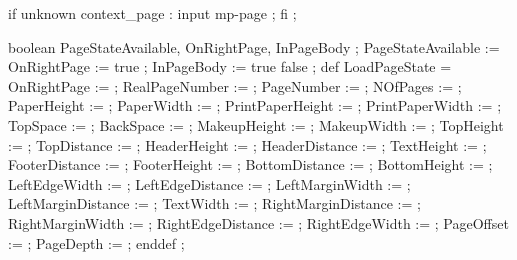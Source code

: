 


\unprotect

\appendtoks
  if unknown context_page : input mp-page ; fi ;
\to \MPinitializations


  boolean PageStateAvailable, OnRightPage, InPageBody ; 
  PageStateAvailable := OnRightPage := true ;
  InPageBody         := \ifinpagebody true \else false \fi ; 
  def LoadPageState =
    OnRightPage         :=      \MPonrightpage ;
    RealPageNumber      :=  \the\realpageno ;
    PageNumber          :=  \the\pageno ;
    NOfPages            :=      \lastpage ;
    PaperHeight         :=  \the\papierhoogte ;
    PaperWidth          :=  \the\papierbreedte ;
    PrintPaperHeight    :=  \the\printpapierhoogte ;
    PrintPaperWidth     :=  \the\printpapierbreedte ;
    TopSpace            :=  \the\kopwit ;
    BackSpace           :=  \the\rugwit ;
    MakeupHeight        :=  \the\zethoogte ;
    MakeupWidth         :=  \the\zetbreedte ;
    TopHeight           :=  \the\bovenhoogte ;
    TopDistance         := \@the\bovenafstand ;
    HeaderHeight        :=  \the\hoofdhoogte ;
    HeaderDistance      := \@the\hoofdafstand ;
    TextHeight          :=  \the\teksthoogte ;
    FooterDistance      := \@the\voetafstand ;
    FooterHeight        :=  \the\voethoogte ;
    BottomDistance      := \@the\onderafstand ;
    BottomHeight        :=  \the\onderhoogte ;
    LeftEdgeWidth       :=  \the\linkerrandbreedte ;
    LeftEdgeDistance    := \@the\linkerrandafstand ;
    LeftMarginWidth     :=  \the\linkermargebreedte ;
    LeftMarginDistance  := \@the\linkermargeafstand ;
    TextWidth           :=  \the\tekstbreedte ;
    RightMarginDistance := \@the\rechtermargeafstand ;
    RightMarginWidth    :=  \the\rechtermargebreedte ;
    RightEdgeDistance   := \@the\rechterrandafstand ;
    RightEdgeWidth      :=  \the\rechterrandbreedte ;
    PageOffset          :=  \the\pageoffset ;
    PageDepth           :=  \the\pagedepth ;
  enddef ;
\stopuseMPgraphic

